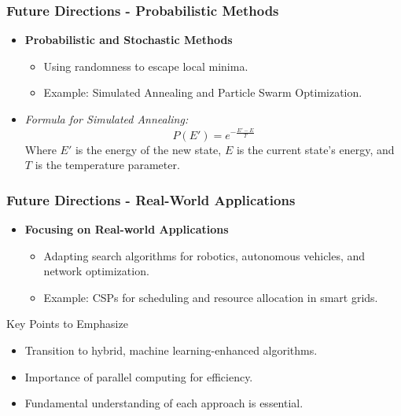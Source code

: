 \documentclass[aspectratio=169]{beamer}
\begin{document}
\begin{frame}[fragile]
    \frametitle{Future Directions - Probabilistic Methods}
    \begin{itemize}
        \item \textbf{Probabilistic and Stochastic Methods}
            \begin{itemize}
                \item Using randomness to escape local minima.
                \item Example: Simulated Annealing and Particle Swarm Optimization.
            \end{itemize}
        \item \textit{Formula for Simulated Annealing:}
        \begin{equation}
            P(E') = e^{-\frac{E' - E}{T}}
        \end{equation}
        Where \(E'\) is the energy of the new state, \(E\) is the current state's energy, and \(T\) is the temperature parameter.
    \end{itemize}
\end{frame}

\begin{frame}[fragile]
    \frametitle{Future Directions - Real-World Applications}
    \begin{itemize}
        \item \textbf{Focusing on Real-world Applications}
            \begin{itemize}
                \item Adapting search algorithms for robotics, autonomous vehicles, and network optimization.
                \item Example: CSPs for scheduling and resource allocation in smart grids.
            \end{itemize}
    \end{itemize}

    \begin{block}{Key Points to Emphasize}
        \begin{itemize}
            \item Transition to hybrid, machine learning-enhanced algorithms.
            \item Importance of parallel computing for efficiency.
            \item Fundamental understanding of each approach is essential.
        \end{itemize}
    \end{block}
\end{frame}
\end{document}
